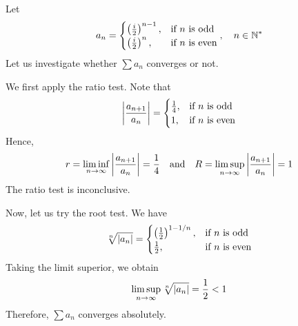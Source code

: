\documentclass[thmcnt=section, 12pt]{my-elegantbook}
\begin{document}

\begin{example}
    Let
    \begin{align*}
        a_n = \begin{cases}
                  \left( \frac{i}{2} \right)^{n-1},
                   & \text{if $n$ is odd}  \\
                  \left( \frac{i}{2} \right)^{n},
                   & \text{if $n$ is even} \\
              \end{cases},
        \quad n \in \mathbb{N}^\ast
    \end{align*}
    Let us investigate whether $\sum a_n$ converges or not.

    We first apply the ratio test. Note that
    \begin{align*}
        \left\lvert \frac{a_{n+1}}{a_n} \right\rvert =
        \begin{cases}
            \frac{1}{4},
             & \text{if $n$ is odd}  \\
            1,
             & \text{if $n$ is even} \\
        \end{cases}
    \end{align*}
    Hence,
    \begin{align*}
        r = \liminf_{n \to \infty} \left\lvert \frac{a_{n+1}}{a_n} \right\rvert
        = \frac{1}{4}
        \quad \text{and} \quad
        R = \limsup_{n \to \infty} \left\lvert \frac{a_{n+1}}{a_n} \right\rvert
        = 1
    \end{align*}
    The ratio test is inconclusive.

    Now, let us try the root test. We have
    \begin{align*}
        \sqrt[n]{\left\lvert a_n \right\rvert} =
        \begin{cases}
            \left( \frac{1}{2} \right)^{1 - 1 / n},
             & \text{if $n$ is odd}  \\
            \frac{1}{2},
             & \text{if $n$ is even} \\
        \end{cases}
    \end{align*}
    Taking the limit superior, we obtain
    \begin{align*}
        \limsup_{n \to \infty} \sqrt[n]{\left\lvert a_n \right\rvert}
        = \frac{1}{2} < 1
    \end{align*}
    Therefore, $\sum a_n$ converges absolutely.
\end{example}

\end{document}
